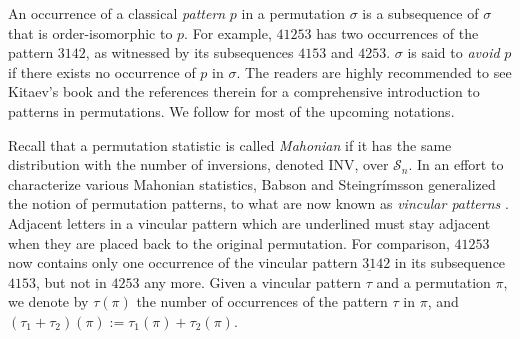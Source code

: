 \documentclass[12pt]{amsart}
\numberwithin{equation}{section}
\theoremstyle{plain}
\theoremstyle{definition}
\def\INV{\mathrm{INV}}
\def\SS{\mathcal{S}}
\begin{document}
An occurrence of a classical \emph{pattern} $p$ in a permutation $\sigma$ is a subsequence of $\sigma$ that is order-isomorphic to $p$. For example, $41253$ has two occurrences of the pattern $3142$, as witnessed by its subsequences $4153$ and $4253$. $\sigma$ is said to \emph{avoid} $p$ if there exists no occurrence of $p$ in $\sigma$. The readers are highly recommended to see Kitaev's book \cite{Kit} and the references therein for a comprehensive introduction to patterns in permutations. We follow \cite{Kit} for most of the upcoming notations.

Recall that a permutation statistic is called \emph{Mahonian} if it has the same distribution with the number of inversions, denoted $\INV$, over $\SS_n$. In an effort to characterize various Mahonian statistics, Babson and Steingr\'{i}msson \cite{BS} generalized the notion of permutation patterns, to what are now known as \emph{vincular patterns} \cite[Chap.~1.3 and Chap.~7]{Kit}. Adjacent letters in a vincular pattern which are
 underlined must stay adjacent when they are placed  back to the original permutation. 
 For comparison, $41253$ now contains only one occurrence of the vincular pattern $\underline{31}42$ in its subsequence $4153$, but not in $4253$ any more. Given a vincular pattern $\tau$ and a permutation $\pi$, we denote by $\tau(\pi)$ the number of occurrences of the pattern $\tau$ in $\pi$, and $(\tau_1+\tau_2)(\pi):=\tau_1(\pi)+\tau_2(\pi)$.
\end{document}
